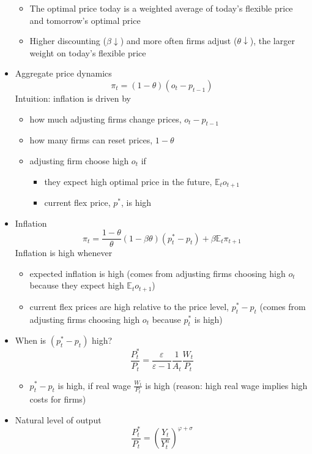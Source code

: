 \documentclass[a4paper]{article}
\begin{document}
\begin{itemize}
\begin{itemize}
        \item The optimal price today is a weighted average of today's flexible price and tomorrow's optimal price
        \item Higher discounting ($\beta\downarrow$) and more often firms adjust ($\theta\downarrow$), the larger weight on today's flexible price
    \end{itemize}
    \item Aggregate price dynamics
    \[\pi_t=(1-\theta)(o_t-p_{t-1}) \]
    Intuition: inflation is driven by
    \begin{itemize}
        \item how much adjusting firms change prices, $o_t-p_{t-1}$
        \item how many firms can reset prices, $1-\theta$
        \item adjusting firm choose high $o_t$ if
        \begin{itemize}
            \item they expect high optimal price in the future, $\mathbb{E}_to_{t+1}$
            \item current flex price, $p^*$, is high
        \end{itemize}
    \end{itemize}
    \item Inflation
    \[\pi_t=\frac{1-\theta}{\theta}(1-\beta\theta)(p_t^*-p_t)+\beta\mathbb{E}_t\pi_{t+1} \]
    Inflation is high whenever
    \begin{itemize}
        \item expected inflation is high (comes from adjusting firms choosing high $o_t$ because they expect high $\mathbb{E}_to_{t+1}$)
        \item current flex prices are high relative to the price level, $p_t^*-p_t$ (comes from adjusting firms choosing high $o_t$ because $p_t^*$ is high)
    \end{itemize}
    \item When is $(p_t^*-p_t)$ high?
    \[\frac{P_t^*}{P_t}=\frac{\varepsilon}{\varepsilon-1}\frac{1}{A_t}\frac{W_t}{P_t} \]
    \begin{itemize}
        \item $p_t^*-p_t$ is high, if real wage $\frac{W_t}{P_t}$ is high (reason: high real wage implies high costs for firms)
    \end{itemize}
    \item Natural level of output
    \[\frac{P_t^*}{P_t}=\left(\frac{Y_t}{Y_t^n} \right)^{\varphi+\sigma} \]
    \begin{itemize}

\end{itemize}
\end{itemize}
\end{document}
